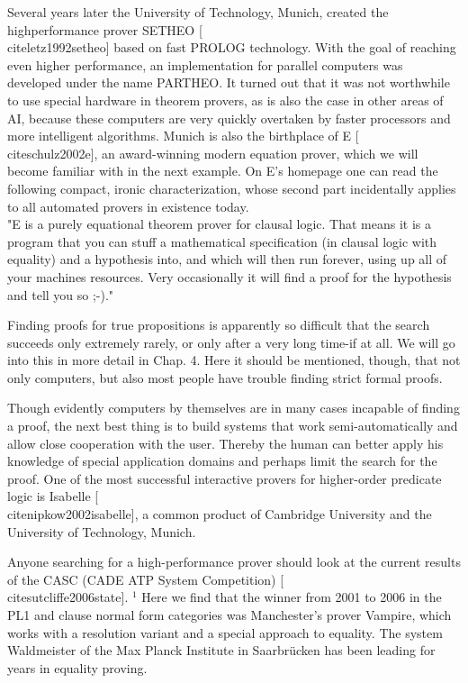 \documentclass[10pt]{book}
\begin{document}
Several years later the University of Technology, Munich, created the highperformance prover SETHEO [\\cite{letz1992setheo}] based on fast PROLOG technology. With the goal of reaching even higher performance, an implementation for parallel computers was developed under the name PARTHEO. It turned out that it was not worthwhile to use special hardware in theorem provers, as is also the case in other areas of AI, because these computers are very quickly overtaken by faster processors and more intelligent algorithms. Munich is also the birthplace of E [\\cite{schulz2002e}], an award-winning modern equation prover, which we will become familiar with in the next example. On E's homepage one can read the following compact, ironic characterization, whose second part incidentally applies to all automated provers in existence today.\\
"E is a purely equational theorem prover for clausal logic. That means it is a program that you can stuff a mathematical specification (in clausal logic with equality) and a hypothesis into, and which will then run forever, using up all of your machines resources. Very occasionally it will find a proof for the hypothesis and tell you so ;-)."


Finding proofs for true propositions is apparently so difficult that the search succeeds only extremely rarely, or only after a very long time-if at all. We will go into this in more detail in Chap. 4. Here it should be mentioned, though, that not only computers, but also most people have trouble finding strict formal proofs.

Though evidently computers by themselves are in many cases incapable of finding a proof, the next best thing is to build systems that work semi-automatically and allow close cooperation with the user. Thereby the human can better apply his knowledge of special application domains and perhaps limit the search for the proof. One of the most successful interactive provers for higher-order predicate logic is Isabelle [\\cite{nipkow2002isabelle}], a common product of Cambridge University and the University of Technology, Munich.

Anyone searching for a high-performance prover should look at the current results of the CASC (CADE ATP System Competition) [\\cite{sutcliffe2006state}]. ${ }^{1}$ Here we find that the winner from 2001 to 2006 in the PL1 and clause normal form categories was Manchester's prover Vampire, which works with a resolution variant and a special approach to equality. The system Waldmeister of the Max Planck Institute in Saarbrücken has been leading for years in equality proving.
\end{document}
